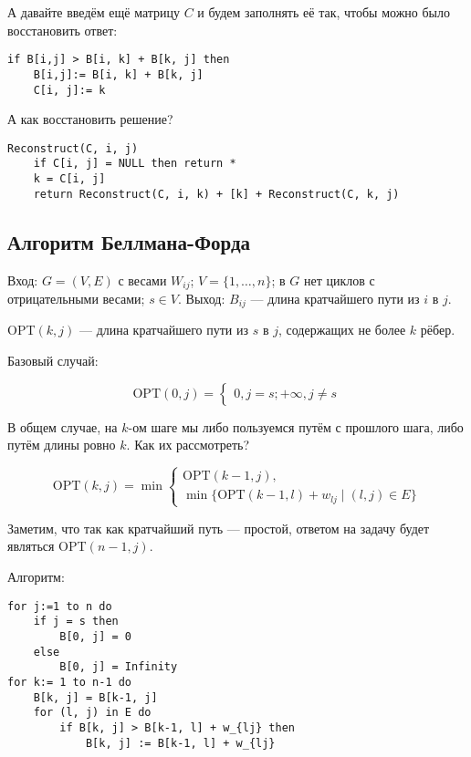 А давайте введём ещё матрицу $C$ и будем заполнять её так, чтобы можно было восстановить ответ:

\begin{lstlisting}
if B[i,j] > B[i, k] + B[k, j] then
    B[i,j]:= B[i, k] + B[k, j]
    C[i, j]:= k
\end{lstlisting}

А как восстановить решение?

\begin{lstlisting}
Reconstruct(C, i, j)
    if C[i, j] = NULL then return *
    k = C[i, j]
    return Reconstruct(C, i, k) + [k] + Reconstruct(C, k, j)
\end{lstlisting}

\subsection{Алгоритм Беллмана-Форда}
Вход: $G = (V, E)$ с весами $W_{ij}$; $V = \{1,\ldots, n\}$; в $G$ нет циклов с отрицательными весами; $s \in V$.
Выход: $B_{ij}$ --- длина кратчайшего пути из $i$ в $j$.

OPT$(k, j)$ --- длина кратчайшего пути из $s$ в $j$, содержащих не более $k$ рёбер.

Базовый случай: 

\[
    \mathrm{OPT}(0, j) = \begin{cases}
        0, j = s;
        +\infty, j\neq s
    \end{cases}
\]

В общем случае, на $k$-ом шаге мы либо пользуемся путём с прошлого шага, либо путём длины ровно $k$. Как их рассмотреть?

\[
    \mathrm{OPT}(k, j) = \min \begin{cases}
        \mathrm{OPT}(k-1, j),\\
        \min\{\mathrm{OPT}(k-1,l)+w_{lj}\mid (l, j)\in E\}
    \end{cases}
\]

Заметим, что так как кратчайший путь --- простой, ответом на задачу будет являться OPT$(n-1, j)$.

Алгоритм:

\begin{lstlisting}
for j:=1 to n do
    if j = s then
        B[0, j] = 0
    else
        B[0, j] = Infinity
for k:= 1 to n-1 do
    B[k, j] = B[k-1, j]
    for (l, j) in E do 
        if B[k, j] > B[k-1, l] + w_{lj} then
            B[k, j] := B[k-1, l] + w_{lj}
\end{lstlisting}


